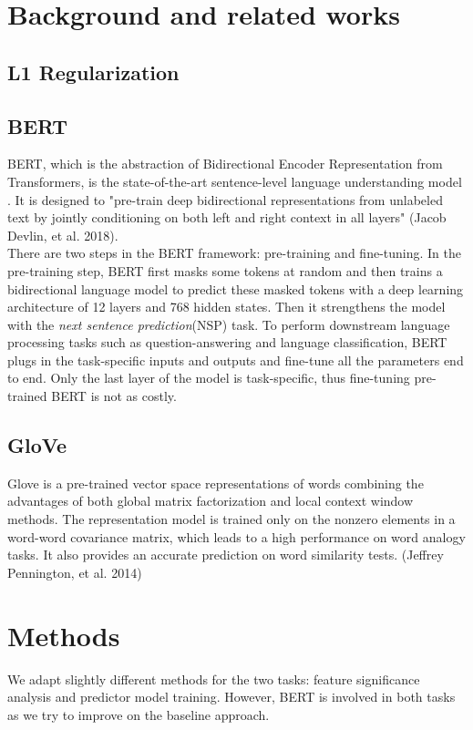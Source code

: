 \documentclass{article}
\begin{document}
\section{Background and related works}

\subsection{L1 Regularization}

\subsection{BERT}
BERT, which is the abstraction of Bidirectional Encoder Representation from Transformers, is the state-of-the-art sentence-level language understanding model . It is designed to "pre-train deep bidirectional representations from unlabeled text by jointly conditioning on both left and right context in all layers" (Jacob Devlin, et al. 2018). \\

There are two steps in the BERT framework: pre-training and fine-tuning. In the pre-training step, BERT first masks some tokens at random and then trains a bidirectional language model to predict these masked tokens with a deep learning architecture of 12 layers and 768 hidden states. Then it strengthens the model with the \textit{next sentence prediction}(NSP) task. To perform downstream language processing tasks such as question-answering and language classification, BERT plugs in the task-specific inputs and outputs and fine-tune all the parameters end to end. Only the last layer of the model is task-specific, thus fine-tuning pre-trained BERT is not as costly. %

\subsection{GloVe}
Glove is a pre-trained vector space representations of words combining the advantages of both global matrix factorization and local context window methods. The representation model is trained only on the nonzero elements in a word-word covariance matrix, which leads to a high performance on word analogy tasks. It also provides an accurate prediction on word similarity tests. (Jeffrey Pennington, et al. 2014)%

\section{Methods}
We adapt slightly different methods for the two tasks: feature significance analysis and predictor model training. However, BERT is involved in both tasks as we try to improve on the baseline approach. \\
\end{document}

